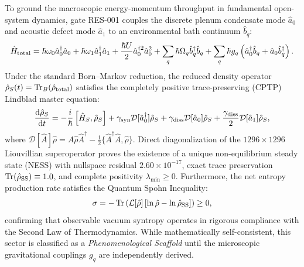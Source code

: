 To ground the macroscopic energy-momentum throughput in fundamental open-system dynamics, gate RES-001 couples the discrete plenum condensate mode $\hat a_0$ and acoustic defect mode $\hat a_1$ to an environmental bath continuum $\hat b_q$:
\begin{equation}
 \hat H_{\rm total} = \hbar\omega_0 \hat a_0^\dagger \hat a_0 + \hbar\omega_1 \hat a_1^\dagger \hat a_1 + \frac{\hbar U}{2}\hat a_0^{\dagger 2}\hat a_0^2 + \sum_q \hbar\Omega_q \hat b_q^\dagger \hat b_q + \sum_q \hbar g_q \left(\hat a_0^\dagger \hat b_q + \hat a_0 \hat b_q^\dagger\right).
\end{equation}
Under the standard Born--Markov reduction, the reduced density operator $\hat\rho_S(t) = \operatorname{Tr}_B(\hat\rho_{\rm total})$ satisfies the completely positive trace-preserving (CPTP) Lindblad master equation:
\begin{equation}
 \frac{\mathrm d\hat\rho_S}{\mathrm d t} = -\frac{i}{\hbar}\left[\hat H_S, \hat\rho_S\right] + \gamma_{\rm syn}\mathcal D[\hat a_0^\dagger]\hat\rho_S + \gamma_{\rm diss}\mathcal D[\hat a_0]\hat\rho_S + \frac{\gamma_{\rm diss}}{2}\mathcal D[\hat a_1]\hat\rho_S,
 \label{eq:lindblad-master}
\end{equation}
where $\mathcal D[\hat A]\hat\rho = \hat A\hat\rho\hat A^\dagger - \frac{1}{2}\{\hat A^\dagger\hat A, \hat\rho\}$.
Direct diagonalization of the $1296\times1296$ Liouvillian superoperator proves the existence of a unique non-equilibrium steady state (NESS) with nullspace residual $2.60\times10^{-17}$, exact trace preservation $\operatorname{Tr}(\hat\rho_{\rm SS})\equiv 1.0$, and complete positivity $\lambda_{\min}\ge 0$. Furthermore, the net entropy production rate satisfies the Quantum Spohn Inequality:
\begin{equation}
 \sigma = -\operatorname{Tr}\left(\mathcal L[\hat\rho]\left[\ln\hat\rho - \ln\hat\rho_{\rm SS}\right]\right) \ge 0,
\end{equation}
confirming that observable vacuum syntropy operates in rigorous compliance with the Second Law of Thermodynamics. While mathematically self-consistent, this sector is classified as a \textit{Phenomenological Scaffold} until the microscopic gravitational couplings $g_q$ are independently derived.
